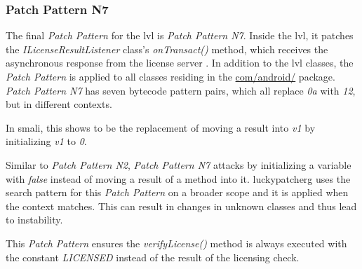 \subsubsection{Patch Pattern N7}
The final \textit{Patch Pattern} for the \gls{lvl} is \textit{Patch Pattern N7}.
Inside the lvl, it patches the \textit{ILicenseResultListener} class's \textit{onTransact()} method, which receives the asynchronous response from the license server \cite{developersLicensingReference}.
In addition to the lvl classes, the \textit{Patch Pattern} is applied to all classes residing in the \url{com/android/} package.
\newline
\textit{Patch Pattern N7} has seven bytecode pattern pairs, which all replace \textit{0a} with \textit{12}, but in different contexts.
\newline

In smali, this shows to be the replacement of moving a result into \textit{v1} by initializing \textit{v1}  to \textit{0}.
\newline

Similar to \textit{Patch Pattern N2}, \textit{Patch Pattern N7} attacks by initializing a variable with \textit{false} instead of moving a result of a method into it.
\newline
\gls{luckypatcherg} uses the search pattern for this \textit{Patch Pattern} on a broader scope and it is applied when the context matches.
This can result in changes in unknown classes and thus lead to instability.
\newline

This \textit{Patch Pattern} ensures the \textit{verifyLicense()} method is always executed with the constant \textit{LICENSED} instead of the result of the licensing check.

